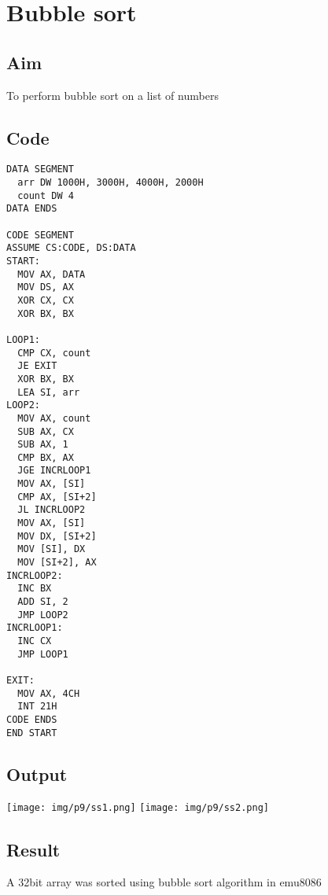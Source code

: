 \section{Bubble sort}
\subsection{Aim}
To perform bubble sort on a list of numbers

\subsection{Code}
\begin{lstlisting}
DATA SEGMENT
  arr DW 1000H, 3000H, 4000H, 2000H
  count DW 4
DATA ENDS

CODE SEGMENT
ASSUME CS:CODE, DS:DATA
START:
  MOV AX, DATA
  MOV DS, AX
  XOR CX, CX
  XOR BX, BX

LOOP1:
  CMP CX, count
  JE EXIT
  XOR BX, BX
  LEA SI, arr
LOOP2:
  MOV AX, count
  SUB AX, CX
  SUB AX, 1
  CMP BX, AX
  JGE INCRLOOP1
  MOV AX, [SI]
  CMP AX, [SI+2]
  JL INCRLOOP2
  MOV AX, [SI]
  MOV DX, [SI+2]
  MOV [SI], DX
  MOV [SI+2], AX
INCRLOOP2:
  INC BX
  ADD SI, 2
  JMP LOOP2
INCRLOOP1:
  INC CX
  JMP LOOP1

EXIT:
  MOV AX, 4CH
  INT 21H
CODE ENDS
END START
\end{lstlisting}

\subsection{Output}
\begin{center}
	\texttt{[image: img/p9/ss1.png]}
	\texttt{[image: img/p9/ss2.png]}
\end{center}

\subsection{Result}
A 32bit array was sorted using bubble sort algorithm in emu8086
